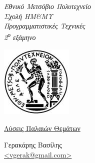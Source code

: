 \begin{titlepage}
\begin{center}

\noindent\begin{minipage}[b]{.55\textwidth}
\begin{Large}
\emph{Εθνικό Μετσόβιο Πολυτεχνείο\\
Σχολή ΗΜ\&ΜΥ\\
Προγραμματιστικές Τεχνικές\\
2\textsuperscript{ο} εξάμηνο}
\end{Large}
\end{minipage}%
\begin{minipage}[b]{.45\textwidth}
     \centering
     \includegraphics[scale=0.8]{title/ntua_logo}
\end{minipage}

\vspace{5cm}
\begin{huge}
\underline{Λύσεις Παλαιών Θεμάτων}
\end{huge}
\vfill

\begin{flushright}
\Large{Γερακάρης Βασίλης}\\
\large{\href{mailto:vgerak@gmail.com}{<vgerak@gmail.com>}}\\
\end{flushright}
\vspace{1cm}

\end{center}
\end{titlepage}

